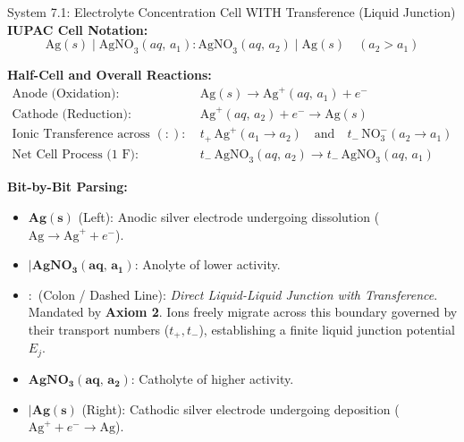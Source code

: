 \documentclass[10pt,a4paper]{article}
\begin{document}
\begin{examplebox}{System 7.1: Electrolyte Concentration Cell WITH Transference (Liquid Junction)}
\textbf{IUPAC Cell Notation:}
\begin{equation*}
    \text{Ag}(s) \mid \text{AgNO}_3(aq,\, a_1) : \text{AgNO}_3(aq,\, a_2) \mid \text{Ag}(s) \quad (a_2 > a_1)
\end{equation*}

\textbf{Half-Cell and Overall Reactions:}
\begin{align*}
    \text{Anode (Oxidation):} \quad & \text{Ag}(s) \longrightarrow \text{Ag}^+(aq,\, a_1) + e^- \\
    \text{Cathode (Reduction):} \quad & \text{Ag}^+(aq,\, a_2) + e^- \longrightarrow \text{Ag}(s) \\
    \text{Ionic Transference across } (:): \quad & t_+\,\text{Ag}^+(a_1 \rightarrow a_2) \quad \text{and} \quad t_-\,\text{NO}_3^-(a_2 \rightarrow a_1) \\
    \text{Net Cell Process ($1\text{ F}$):} \quad & t_-\,\text{AgNO}_3(aq,\, a_2) \longrightarrow t_-\,\text{AgNO}_3(aq,\, a_1)
\end{align*}

\textbf{Bit-by-Bit Parsing:}
\begin{itemize}[leftmargin=*]
    \item $\mathbf{Ag(s)}$ (Left): Anodic silver electrode undergoing dissolution ($\text{Ag} \rightarrow \text{Ag}^+ + e^-$).
    \item $\mathbf{\mid AgNO_3(aq,\, a_1)}$: Anolyte of lower activity.
    \item $\mathbf{:}$ (Colon / Dashed Line): \textit{Direct Liquid-Liquid Junction with Transference}. Mandated by \textbf{Axiom 2}. Ions freely migrate across this boundary governed by their transport numbers ($t_+, t_-$), establishing a finite liquid junction potential $E_j$.
    \item $\mathbf{AgNO_3(aq,\, a_2)}$: Catholyte of higher activity.
    \item $\mathbf{\mid Ag(s)}$ (Right): Cathodic silver electrode undergoing deposition ($\text{Ag}^+ + e^- \rightarrow \text{Ag}$).
\end{itemize}
\end{examplebox}
\end{document}
